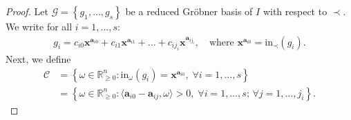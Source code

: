 \documentclass[a4paper, 11pt]{article}
\begin{document}
\begin{proof}
  Let \( \mathcal{G} = \left\{ g_1,\dots,g_s \right\} \) be a reduced Gröbner basis of \( I \) with respect to \( \prec \). We write for all \( i=1,\dots,s \):
  \begin{align*}
    g_i = c_{i0} \mathbf{x}^{\mathbf{a}_{i0}} + c_{i1} \mathbf{x}^{\mathbf a_{i1}} + \dots + c_{ij_i} \mathbf{x}^{\mathbf a_{ij_i}}, \quad \text{where } \mathbf{x}^{\mathbf{a}_{i0}} = \mathrm{in}_\prec(g_i).
  \end{align*}
  Next, we define 
  \begin{align*}
    \mathcal{C} &= \left\{ \omega \in \mathbb R_{\geq 0}^n : \mathrm{in}_\omega(g_i)= \mathbf{x}^{\mathbf{a}_{i0}}, \; \forall i=1, \dots, s \right\}  \\
    &= \left\{ 
      \omega \in \mathbb R_{\geq 0}^n :  \langle \mathbf a_{i0} - \mathbf{a}_{ij}, \omega \rangle > 0, \; \forall i=1,\dots,s; \,\forall  j = 1, \dots, j_i
     \right\}.
  \end{align*}


\end{proof}
\end{document}
